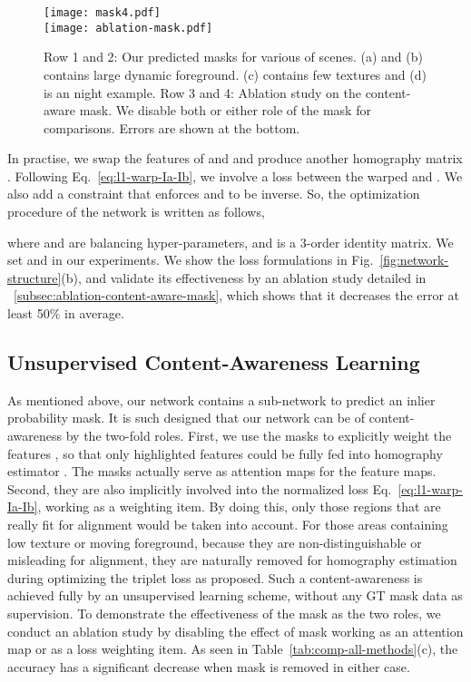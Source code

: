 \documentclass[runningheads]{llncs}
\begin{document}
\begin{figure*}[t]
  \centering
  \texttt{[image: mask4.pdf]}\\
  \makebox[\linewidth]{\rule{0.95\linewidth}{0.4pt}}
  \texttt{[image: ablation-mask.pdf]}\caption{ Row 1 and 2: Our predicted masks for various of scenes. (a) and (b) contains large dynamic foreground. (c) contains few textures and (d) is an night example. Row 3 and 4: Ablation study on the content-aware mask. We disable both or either role of the mask for comparisons. Errors are shown at the bottom.}\label{fig:mask}
\end{figure*}

In practise, we swap the features of  and  and produce another homography matrix . Following Eq.~\ref{eq:l1-warp-Ia-Ib}, we involve a loss  between the warped  and . We also add a constraint that enforces  and  to be inverse. So, the optimization procedure of the network is written as follows,

 where  and  are balancing hyper-parameters, and  is a 3-order identity matrix. We set  and  in our experiments. We show the loss formulations in Fig.~\ref{fig:network-structure}(b), and validate its effectiveness by an ablation study detailed in \secname~\ref{subsec:ablation-content-aware-mask}, which shows that it decreases the error at least 50\% in average.

\subsection{Unsupervised Content-Awareness Learning}\label{subsec:unsupervised-content-awareness-learning}As mentioned above, our network contains a sub-network  to predict an inlier probability mask. It is such designed that our network can be of content-awareness by the two-fold roles. First, we use the masks  to explicitly weight the features , so that only highlighted features could be fully fed into homography estimator . The masks actually serve as attention maps for the feature maps. Second, they are also implicitly involved into the normalized loss Eq.~\ref{eq:l1-warp-Ia-Ib}, working as a weighting item.
By doing this, only those regions that are really fit for alignment would be taken into account. For those areas containing low texture or moving foreground, because they are non-distinguishable or misleading for alignment, they are naturally removed for homography estimation during optimizing the triplet loss as proposed. Such a content-awareness is achieved fully by an unsupervised learning scheme, without any GT mask data as supervision. To demonstrate the effectiveness of the mask as the two roles, we conduct an ablation study by disabling the effect of mask working as an attention map or as a loss weighting item. As seen in Table~\ref{tab:comp-all-methods}(c), the accuracy has a significant decrease when mask is removed in either case.
\end{document}
